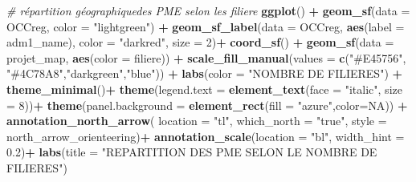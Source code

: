 \documentclass[
]{article}
\newenvironment{Shaded}{\begin{snugshade}}{\end{snugshade}}
\newcommand{\AttributeTok}[1]{\textcolor[rgb]{0.13,0.29,0.53}{#1}}
\newcommand{\CommentTok}[1]{\textcolor[rgb]{0.56,0.35,0.01}{\textit{#1}}}
\newcommand{\ConstantTok}[1]{\textcolor[rgb]{0.56,0.35,0.01}{#1}}
\newcommand{\DecValTok}[1]{\textcolor[rgb]{0.00,0.00,0.81}{#1}}
\newcommand{\FloatTok}[1]{\textcolor[rgb]{0.00,0.00,0.81}{#1}}
\newcommand{\FunctionTok}[1]{\textcolor[rgb]{0.13,0.29,0.53}{\textbf{#1}}}
\newcommand{\NormalTok}[1]{#1}
\newcommand{\SpecialCharTok}[1]{\textcolor[rgb]{0.81,0.36,0.00}{\textbf{#1}}}
\newcommand{\StringTok}[1]{\textcolor[rgb]{0.31,0.60,0.02}{#1}}
\begin{document}
\begin{Shaded}
\begin{Highlighting}[]
\CommentTok{\# répartition géographiquedes PME selon les filiere}
\FunctionTok{ggplot}\NormalTok{() }\SpecialCharTok{+}
  \FunctionTok{geom\_sf}\NormalTok{(}\AttributeTok{data =}\NormalTok{ OCCreg, }\AttributeTok{color =} \StringTok{"lightgreen"}\NormalTok{) }\SpecialCharTok{+}  
  \FunctionTok{geom\_sf\_label}\NormalTok{(}\AttributeTok{data =}\NormalTok{ OCCreg, }
                \FunctionTok{aes}\NormalTok{(}\AttributeTok{label =}\NormalTok{ adm1\_name), }\AttributeTok{color =} \StringTok{"darkred"}\NormalTok{, }\AttributeTok{size =} \DecValTok{2}\NormalTok{)}\SpecialCharTok{+}
  \FunctionTok{coord\_sf}\NormalTok{() }\SpecialCharTok{+}
  \FunctionTok{geom\_sf}\NormalTok{(}\AttributeTok{data =}\NormalTok{ projet\_map, }\FunctionTok{aes}\NormalTok{(}\AttributeTok{color =}\NormalTok{ filiere)) }\SpecialCharTok{+}
  \FunctionTok{scale\_fill\_manual}\NormalTok{(}\AttributeTok{values =} \FunctionTok{c}\NormalTok{(}\StringTok{"\#E45756"}\NormalTok{, }\StringTok{"\#4C78A8"}\NormalTok{,}\StringTok{"darkgreen"}\NormalTok{,}\StringTok{"blue"}\NormalTok{)) }\SpecialCharTok{+} 
  \FunctionTok{labs}\NormalTok{(}\AttributeTok{color =} \StringTok{"NOMBRE DE FILIERES"}\NormalTok{) }\SpecialCharTok{+}
  \FunctionTok{theme\_minimal}\NormalTok{()}\SpecialCharTok{+}
  \FunctionTok{theme}\NormalTok{(}\AttributeTok{legend.text =} \FunctionTok{element\_text}\NormalTok{(}\AttributeTok{face =} \StringTok{"italic"}\NormalTok{, }\AttributeTok{size =} \DecValTok{8}\NormalTok{))}\SpecialCharTok{+}
  \FunctionTok{theme}\NormalTok{(}\AttributeTok{panel.background =} \FunctionTok{element\_rect}\NormalTok{(}\AttributeTok{fill =} \StringTok{"azure"}\NormalTok{,}\AttributeTok{color=}\ConstantTok{NA}\NormalTok{)) }\SpecialCharTok{+}
  \FunctionTok{annotation\_north\_arrow}\NormalTok{(}
    \AttributeTok{location =} \StringTok{"tl"}\NormalTok{, }\AttributeTok{which\_north =} \StringTok{"true"}\NormalTok{, }\AttributeTok{style =}\NormalTok{ north\_arrow\_orienteering)}\SpecialCharTok{+}
  \FunctionTok{annotation\_scale}\NormalTok{(}\AttributeTok{location =} \StringTok{"bl"}\NormalTok{, }\AttributeTok{width\_hint =} \FloatTok{0.2}\NormalTok{)}\SpecialCharTok{+}
  \FunctionTok{labs}\NormalTok{(}\AttributeTok{title =} \StringTok{"REPARTITION DES PME SELON LE NOMBRE DE FILIERES"}\NormalTok{)}
\end{Highlighting}
\end{Shaded}
\end{document}
